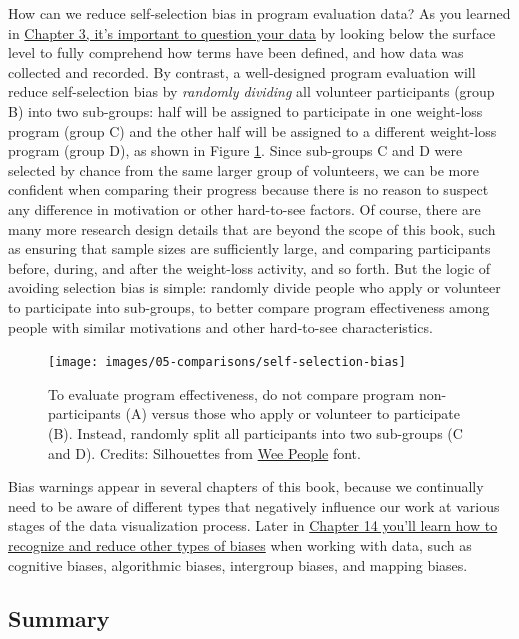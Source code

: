 \documentclass[
  english,
]{book}
\begin{document}
How can we reduce self-selection bias in program evaluation data? As you learned in \href{question.html}{Chapter 3, it's important to question your data} by looking below the surface level to fully comprehend how terms have been defined, and how data was collected and recorded. By contrast, a well-designed program evaluation will reduce self-selection bias by \emph{randomly dividing} all volunteer participants (group B) into two sub-groups: half will be assigned to participate in one weight-loss program (group C) and the other half will be assigned to a different weight-loss program (group D), as shown in Figure \ref{fig:self-selection-bias}. Since sub-groups C and D were selected by chance from the same larger group of volunteers, we can be more confident when comparing their progress because there is no reason to suspect any difference in motivation or other hard-to-see factors. Of course, there are many more research design details that are beyond the scope of this book, such as ensuring that sample sizes are sufficiently large, and comparing participants before, during, and after the weight-loss activity, and so forth. But the logic of avoiding selection bias is simple: randomly divide people who apply or volunteer to participate into sub-groups, to better compare program effectiveness among people with similar motivations and other hard-to-see characteristics.



\begin{figure}
\texttt{[image: images/05-comparisons/self-selection-bias]} \caption{To evaluate program effectiveness, do not compare program non-participants (A) versus those who apply or volunteer to participate (B). Instead, randomly split all participants into two sub-groups (C and D). Credits: Silhouettes from \href{https://github.com/propublica/weepeople}{Wee People} font.}\label{fig:self-selection-bias}
\end{figure}

Bias warnings appear in several chapters of this book, because we continually need to be aware of different types that negatively influence our work at various stages of the data visualization process. Later in \href{data-bias.html}{Chapter 14 you'll learn how to recognize and reduce other types of biases} when working with data, such as cognitive biases, algorithmic biases, intergroup biases, and mapping biases.

\hypertarget{summary5}{%
\subsection*{Summary}\label{summary5}}
\end{document}
